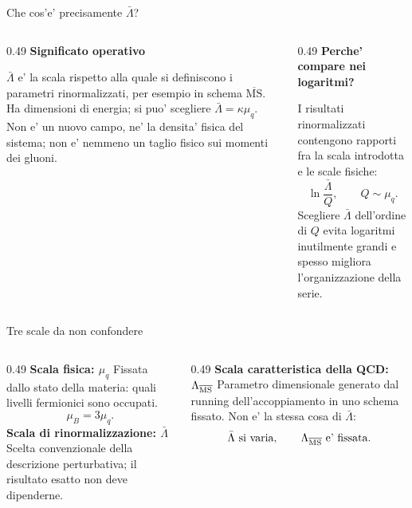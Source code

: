 \begin{frame}{Che cos'e' precisamente $\bar\Lambda$?}
\small
\begin{columns}[T,onlytextwidth]
\begin{column}{0.49\textwidth}
\textbf{Significato operativo}

$\bar\Lambda$ e' la scala rispetto alla quale
si definiscono i parametri rinormalizzati,
per esempio in schema $\overline{\mathrm{MS}}$.
\medskip
Ha dimensioni di energia; si puo' scegliere
$\bar\Lambda=\kappa\mu_q$.
\medskip
Non e' un nuovo campo, ne' la densita'
fisica del sistema; non e' nemmeno
un taglio fisico sui momenti dei gluoni.
\end{column}
\begin{column}{0.49\textwidth}
\textbf{Perche' compare nei logaritmi?}

I risultati rinormalizzati contengono rapporti
fra la scala introdotta e le scale fisiche:
\[
\ln\frac{\bar\Lambda}{Q},
\qquad Q\sim\mu_q.
\]
Scegliere $\bar\Lambda$ dell'ordine di $Q$
evita logaritmi inutilmente grandi e spesso
migliora l'organizzazione della serie.
\end{column}
\end{columns}
\end{frame}

\begin{frame}{Tre scale da non confondere}
\small
\begin{columns}[T,onlytextwidth]
\begin{column}{0.49\textwidth}
\textbf{Scala fisica: $\mu_q$}
\medskip
Fissata dallo stato della materia:
quali livelli fermionici sono occupati.
\[
\mu_B=3\mu_q.
\]
\textbf{Scala di rinormalizzazione: $\bar\Lambda$}
\medskip
Scelta convenzionale della descrizione
perturbativa; il risultato esatto non deve
dipenderne.
\end{column}
\begin{column}{0.49\textwidth}
\textbf{Scala caratteristica della QCD:
$\Lambda_{\overline{\rm MS}}$}
\medskip
Parametro dimensionale generato dal running
dell'accoppiamento in uno schema fissato.
\medskip
Non e' la stessa cosa di $\bar\Lambda$:
\[
\bar\Lambda\ \text{si varia},
\qquad
\Lambda_{\overline{\rm MS}}\ \text{e' fissata}.
\]
\end{column}
\end{columns}
\end{frame}


